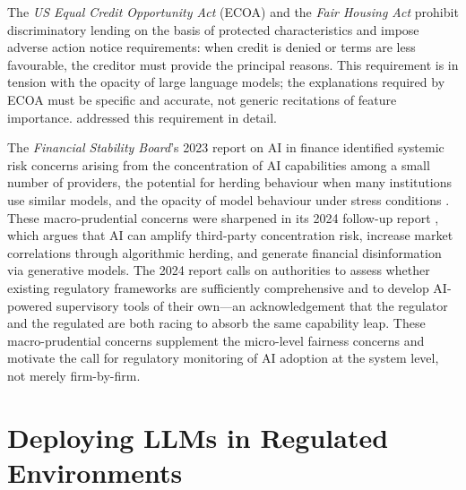 \begin{context}
The \emph{US Equal Credit Opportunity Act} (ECOA) and the \emph{Fair Housing Act} prohibit discriminatory lending on the basis of protected characteristics and impose adverse action notice requirements: when credit is denied or terms are less favourable, the creditor must provide the principal reasons. This requirement is in tension with the opacity of large language models; the explanations required by ECOA must be specific and accurate, not generic recitations of feature importance.  addressed this requirement in detail.

The \emph{Financial Stability Board}'s 2023 report on AI in finance identified systemic risk concerns arising from the concentration of AI capabilities among a small number of providers, the potential for herding behaviour when many institutions use similar models, and the opacity of model behaviour under stress conditions \cite{fsb2023ai}. These macro-prudential concerns were sharpened in its 2024 follow-up report \citep{FSB2024stability}, which argues that AI can amplify third-party concentration risk, increase market correlations through algorithmic herding, and generate financial disinformation via generative models. The 2024 report calls on authorities to assess whether existing regulatory frameworks are sufficiently comprehensive and to develop AI-powered supervisory tools of their own---an acknowledgement that the regulator and the regulated are both racing to absorb the same capability leap. These macro-prudential concerns supplement the micro-level fairness concerns and motivate the call for regulatory monitoring of AI adoption at the system level, not merely firm-by-firm.

\end{context}


\section{Deploying LLMs in Regulated Environments}
\label{sec:af-deployment}

